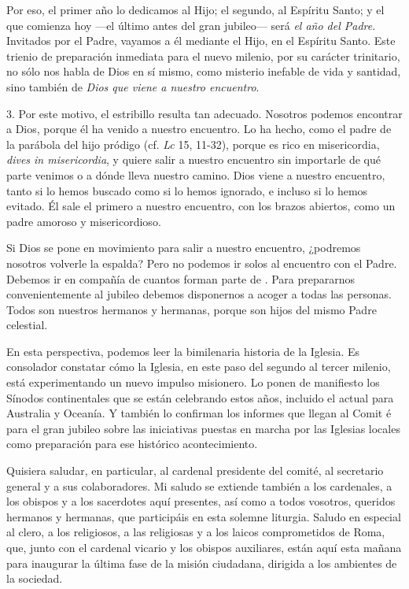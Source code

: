 \begin{body}
Por eso, el primer año lo dedicamos al Hijo; el segundo, al Espíritu Santo; y el que comienza hoy ---el último antes del gran jubileo--- será \emph{el año del Padre}. Invitados por el Padre, vayamos a él mediante el Hijo, en el Espíritu Santo. Este trienio de preparación inmediata para el nuevo milenio, por su carácter trinitario, no sólo nos habla de Dios en sí mismo, como misterio inefable de vida y santidad, sino también de \emph{Dios que viene a nuestro encuentro}.

3. Por este motivo, el estribillo  resulta tan adecuado. Nosotros podemos encontrar a Dios, porque él ha venido a nuestro encuentro. Lo ha hecho, como el padre de la parábola del hijo pródigo (cf. \emph{Lc} 15, 11-32), porque es rico en misericordia, \emph{dives in misericordia}, y quiere salir a nuestro encuentro sin importarle de qué parte venimos o a dónde lleva nuestro camino. Dios viene a nuestro encuentro, tanto si lo hemos buscado como si lo hemos ignorado, e incluso si lo hemos evitado. Él sale el primero a nuestro encuentro, con los brazos abiertos, como un padre amoroso y misericordioso.

Si Dios se pone en movimiento para salir a nuestro encuentro, ¿podremos nosotros volverle la espalda? Pero no podemos ir solos al encuentro con el Padre. Debemos ir en compañía de cuantos forman parte de . Para prepararnos convenientemente al jubileo debemos disponernos a acoger a todas las personas. Todos son nuestros hermanos y hermanas, porque son hijos del mismo Padre celestial.

En esta perspectiva, podemos leer la bimilenaria historia de la Iglesia. Es consolador constatar cómo la Iglesia, en este paso del segundo al tercer milenio, está experimentando un nuevo impulso misionero. Lo ponen de manifiesto los Sínodos continentales que se están celebrando estos años, incluido el actual para Australia y Oceanía. Y también lo confirman los informes que llegan al Comit é para el gran jubileo sobre las iniciativas puestas en marcha por las Iglesias locales como preparación para ese histórico acontecimiento.

Quisiera saludar, en particular, al cardenal presidente del comité, al secretario general y a sus colaboradores. Mi saludo se extiende también a los cardenales, a los obispos y a los sacerdotes aquí presentes, así como a todos vosotros, queridos hermanos y hermanas, que participáis en esta solemne liturgia. Saludo en especial al clero, a los religiosos, a las religiosas y a los laicos comprometidos de Roma, que, junto con el cardenal vicario y los obispos auxiliares, están aquí esta mañana para inaugurar la última fase de la misión ciudadana, dirigida a los ambientes de la sociedad.


\end{body}
